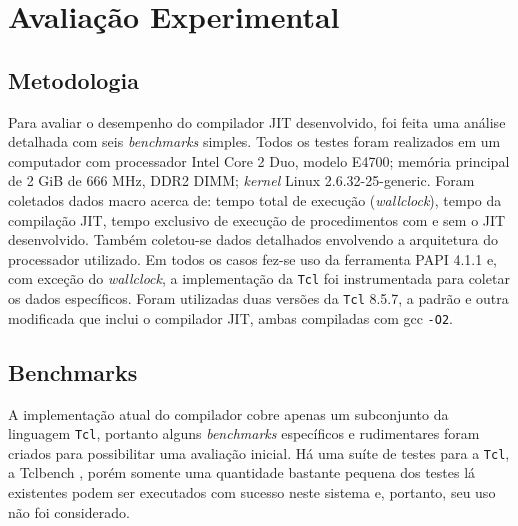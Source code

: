 \chapter{Avaliação Experimental}
\label{avaliacao}

\section{Metodologia}
\label{sec:metodologia}


Para avaliar o desempenho do compilador JIT desenvolvido, foi feita uma
análise detalhada com seis \textit{benchmarks} simples. Todos os
testes foram realizados em um computador com processador Intel Core 2
Duo, modelo E4700; memória principal de 2 GiB de 666 MHz, DDR2 DIMM;
\textit{kernel} Linux 2.6.32-25-generic. Foram coletados dados macro acerca
de: tempo total de execução (\textit{wallclock}),
tempo da compilação JIT, tempo exclusivo de execução de procedimentos
com e sem o JIT desenvolvido. Também coletou-se dados detalhados
envolvendo a arquitetura do processador utilizado.
Em todos os casos fez-se uso da ferramenta PAPI \cite{papisite}
 4.1.1 e,
com exceção do \textit{wallclock}, a implementação da \texttt{Tcl} foi
instrumentada para coletar os dados específicos. Foram utilizadas duas
versões da \texttt{Tcl} 8.5.7, a padrão e outra modificada que inclui
o compilador JIT, ambas compiladas com gcc \verb!-O2!.


\section{Benchmarks}

A implementação atual do compilador cobre apenas um subconjunto
da linguagem \texttt{Tcl}, portanto alguns \textit{benchmarks}
específicos e rudimentares foram criados para possibilitar
uma avaliação inicial. Há uma suíte de testes para a \texttt{Tcl}, a Tclbench
\cite{tclbench-site}, porém somente uma quantidade bastante pequena dos
testes lá existentes podem ser executados com sucesso neste sistema e,
portanto, seu uso não foi considerado.

